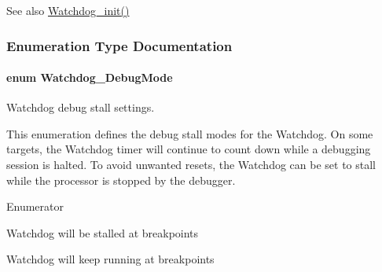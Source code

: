 \begin{DoxySeeAlso}{See also}
\hyperlink{_watchdog_8h_afaadfb59be17661ae95562f2081355e7}{Watchdog\+\_\+init()} 
\end{DoxySeeAlso}


\subsubsection{Enumeration Type Documentation}
\paragraph[{Watchdog\+\_\+\+Debug\+Mode}]{\setlength{\rightskip}{0pt plus 5cm}enum {\bf Watchdog\+\_\+\+Debug\+Mode}}\label{_watchdog_8h_ab1aa5862661c88a16b9d7bc12709d51e}


Watchdog debug stall settings. 

This enumeration defines the debug stall modes for the Watchdog. On some targets, the Watchdog timer will continue to count down while a debugging session is halted. To avoid unwanted resets, the Watchdog can be set to stall while the processor is stopped by the debugger. \begin{Desc}
\item[Enumerator]\par
\begin{description}
\item[{\em 
Watchdog\+\_\+\+D\+E\+B\+U\+G\+\_\+\+S\+T\+A\+L\+L\+\_\+\+O\+N\label{_watchdog_8h_ab1aa5862661c88a16b9d7bc12709d51ea787c87976091a6f294070dadd1747ed0}
}]Watchdog will be stalled at breakpoints \item[{\em 
Watchdog\+\_\+\+D\+E\+B\+U\+G\+\_\+\+S\+T\+A\+L\+L\+\_\+\+O\+F\+F\label{_watchdog_8h_ab1aa5862661c88a16b9d7bc12709d51ea745be9d89bc0c15eda5c4082020f8bb2}
}]Watchdog will keep running at breakpoints \end{description}
\end{Desc}
